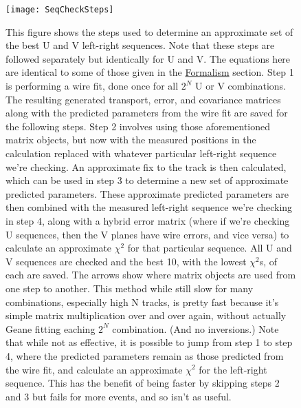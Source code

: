 			\begin{figure}[]
				\caption{This figure shows the steps used to determine an approximate set of the best U and V left-right sequences. Note that these steps are followed separately but identically for U and V. The equations here are identical to some of those given in the \hyperref[sec:Formalism]{Formalism} section. Step 1 is performing a wire fit, done once for all $2^{N}$ U or V combinations. The resulting generated transport, error, and covariance matrices along with the predicted parameters from the wire fit are saved for the following steps. Step 2 involves using those aforementioned matrix objects, but now with the measured positions in the calculation replaced with whatever particular left-right sequence we're checking. An approximate fix to the track is then calculated, which can be used in step 3 to determine a new set of approximate predicted parameters. These approximate predicted parameters are then combined with the measured left-right sequence we're checking in step 4, along with a hybrid error matrix (where if we're checking U sequences, then the V planes have wire errors, and vice versa) to calculate an approximate $\chi^{2}$ for that particular sequence. All U and V sequences are checked and the best 10, with the lowest $\chi^{2}$s, of each are saved. The arrows show where matrix objects are used from one step to another. This method while still slow for many combinations, especially high N tracks, is pretty fast because it's simple matrix multiplication over and over again, without actually Geane fitting eaching $2^{N}$ combination. (And no inversions.) Note that while not as effective, it is possible to jump from step 1 to step 4, where the predicted parameters remain as those predicted from the wire fit, and calculate an approximate $\chi^{2}$ for the left-right sequence. This has the benefit of being faster by skipping steps 2 and 3 but fails for more events, and so isn't as useful.}
				\centering
				\texttt{[image: SeqCheckSteps]}
				\label{fig:SeqCheckSteps}
			\end{figure}

